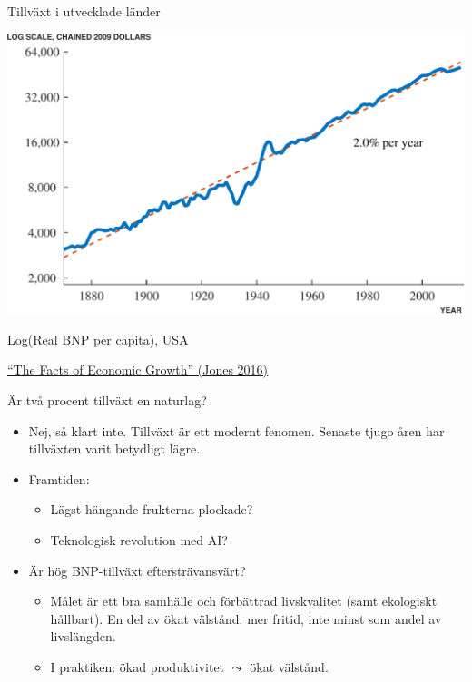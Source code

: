 \documentclass{beamer}
\begin{document}
\begin{frame}{Tillväxt i utvecklade länder}

	\begin{center}
        \includegraphics[scale=0.4]{figures/uspcgdp2-crop.pdf}

        Log(Real BNP per capita), USA
    \end{center}
    
    \bigskip

    {\footnotesize\color{blue}\href{https://web.stanford.edu/~chadj/facts.pdf}{``The Facts of Economic Growth'' (Jones 2016)}}
\end{frame}

\begin{frame}{Är två procent tillväxt en naturlag?}

    \begin{itemize}
        \item Nej, så klart inte. Tillväxt är ett modernt fenomen. Senaste tjugo åren har tillväxten varit betydligt lägre.
        \item Framtiden:
        \begin{itemize}
            \item Lägst hängande frukterna plockade?
            \item Teknologisk revolution med AI?
        \end{itemize}

        \bigskip

        \item Är hög BNP-tillväxt eftersträvansvärt?
        \begin{itemize}
            \item Målet är ett bra samhälle och förbättrad livskvalitet (samt ekologiskt hållbart). En del av ökat välstånd: mer fritid, inte minst som andel av livslängden.
            \item I praktiken: ökad produktivitet $\leadsto$ ökat välstånd.
        \end{itemize}
    \end{itemize}
    
\end{frame}
\end{document}
